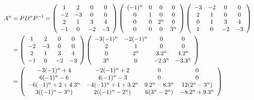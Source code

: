 {\begin{enumerate}
{\begin{align*}\ensuremath
A^n&=PD^nP^{-1}=\left(
\begin{array}{cccc}
1&2&0&0\\
-2&-3&0&0\\
2&1&3&4\\
-1&0&-2&-3
\end{array}
\right)\left(
\begin{array}{cccc}
(-1)^n&0&0&0\\
0&1&0&0\\
0&0&2^n&0\\
0&0&0&3^n
\end{array}
\right)\left(
\begin{array}{cccc}
-3&-2&0&0\\
2&1&0&0\\
0&1&3&4\\
1&0&-2&-3
\end{array}
\right)
\\
 &=\left(
\begin{array}{cccc}
1&2&0&0\\
-2&-3&0&0\\
2&1&3&4\\
-1&0&-2&-3
\end{array}
\right)\left(
\begin{array}{cccc}
-3(-1)^n&-2(-1)^n&0&0\\
2&1&0&0\\
0&2^n&3.2^n&4.2^n\\
3^n&0&-2.3^n&-3.3^n
\end{array}
\right)\\
 &=\left(
\begin{array}{cccc}
-3(-1)^n+4&-2(-1)^n+2&0&0\\
6(-1)^n-6&4(-1)^n-3&0&0\\
-6(-1)^n+2+4.3^n&-4(-1)^n+1+3.2^n&9.2^n-8.3^n&12(2^n-3^n)\\
3((-1)^n-3^n)&2((-1)^n-2^n)&6(3^n-2^n)&-8.2^n+9.3^n
\end{array}
\right)
\end{align*}
}
\end{enumerate}
}
